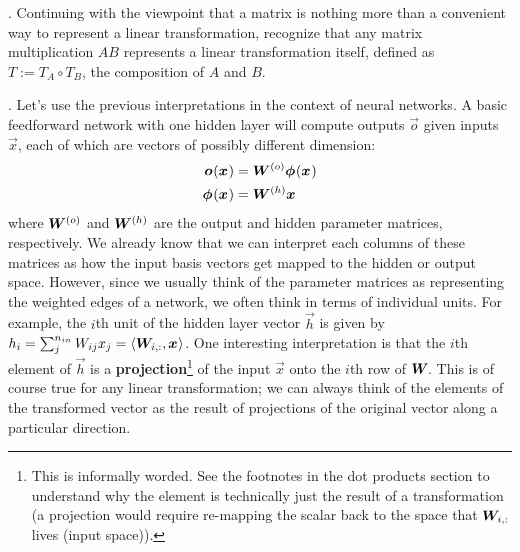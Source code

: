\documentclass[11pt]{article}
\begin{document}
\myspace
{}. Continuing with the viewpoint that a matrix is nothing more than a convenient way to represent a linear transformation, recognize that any matrix multiplication $A B$ represents a linear transformation itself, defined as $T := T_A \circ T_B$, the composition of $A$ and $B$. 

\myspace
\p {}. Let's use the previous interpretations in the context of neural networks. A basic feedforward network with one hidden layer will compute outputs $\vec o$ given inputs $\vec x$, each of which are vectors of possibly different dimension:
\begin{align}
\vec{o}(\vec x) 
	&= \matr{W}^{(o)} \vec{\phi}(\vec x) \\
\vec{\phi}(\vec x)
	&= \matr{W}^{(h)} \vec x
\end{align}
where $\matr{W}^{(o)}$ and $\matr{W}^{(h)}$ are the output and hidden parameter matrices, respectively. We already know that we can interpret each columns of these matrices as how the input basis vectors get mapped to the hidden or output space. However, since we usually think of the parameter matrices as representing the weighted edges of a network, we often think in terms of individual units. For example, the $i$th unit of the hidden layer vector $\vec h$ is given by $h_i = \sum_j^{n_{in}} W_{ij} x_j = \langle \matr[i,:]{W} ,  \vec x \rangle$. One interesting interpretation is that the $i$th element of $\vec h$ is a \textbf{projection}\footnote{This is informally worded. See the footnotes in the dot products section to understand why the element is technically just the result of a transformation (a projection would require re-mapping the scalar back to the space that $\matr[i, :]{W}$ lives (input space)).} of the input $\vec x$ onto the $i$th row of $\matr W$. This is of course true for any linear transformation; we can always think of the elements of the transformed vector as the result of projections of the original vector along a particular direction.
\end{document}
